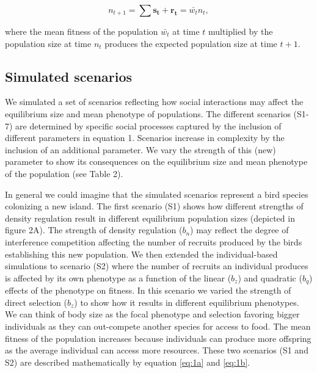 \documentclass{article}
\begin{document}
\begin{equation} \label{eq:fitness measure}
n_{t+1}=\sum \mathbf{s_{t}} + \mathbf{r_{t}}=\bar{w_{t}}n_{t}, 
\end{equation}

\noindent where the mean fitness of the population $\bar{w_{t}}$ at time $t$ multiplied by the population size at time $n_{t}$ produces the expected population size at time $t + 1$. 

 
\subsection{Simulated scenarios}
We simulated a set of scenarios reflecting how social interactions may affect the equilibrium size and mean phenotype of populations. The different scenarios (S1-7) are determined by specific social processes captured by the inclusion of different parameters in equation 1. Scenarios increase in complexity by the inclusion of an additional parameter. We vary the strength of this (new) parameter to show its consequences on the equilibrium size and mean phenotype of the population (see Table 2). 

In general we could imagine that the simulated scenarios represent a bird species colonizing a new island. The first scenario (S1) shows how different strengths of density regulation result in different equilibrium population sizes (depicted in figure 2A). The strength of density regulation ($b_n$) may reflect the degree of interference competition affecting the number of recruits produced by the birds establishing this new population. We then extended the individual-based simulations to scenario (S2) where the number of recruits an individual produces is affected by its own phenotype as a function of the linear ($b_z$) and quadratic ($b_q$) effects of the phenotype on fitness. In this scenario we varied the strength of direct selection ($b_z$) to show how it results in different equilibrium phenotypes. We can think of body size as the focal phenotype and selection favoring bigger individuals as they can out-compete another species for access to food. The mean fitness of the population increases because individuals can produce more offspring as the average individual can access more resources. These two scenarios (S1 and S2) are described mathematically by equation \ref{eq:1a} and \ref{eq:1b}. 
\end{document}
